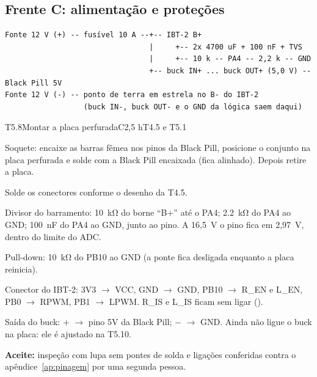 \documentclass[11pt,a4paper]{article}
\newcommand{\cmd}[1]{\texttt{\detokenize{#1}}}   %
\newcommand{\arq}[1]{\path{#1}}                    %
\newcommand{\flecha}{\ensuremath{\rightarrow}}
\begin{document}
\subsection{Frente C: alimentação e proteções}

\begin{tcolorbox}[enhanced, colback=black!3, colframe=black!40, boxrule=0.5pt, arc=1.5pt,
    title={Esquema de alimentação (de \arq{docs/ligacoes.md})},
    fonttitle=\sffamily\bfseries\small, colbacktitle=black!60, coltitle=white,
    fontupper=\footnotesize]
\begin{verbatim}
Fonte 12 V (+) -- fusível 10 A --+-- IBT-2 B+
                                 |     +-- 2x 4700 uF + 100 nF + TVS
                                 |     +-- 10 k -- PA4 -- 2,2 k -- GND
                                 +-- buck IN+ ... buck OUT+ (5,0 V) -- Black Pill 5V
Fonte 12 V (-) -- ponto de terra em estrela no B- do IBT-2
                  (buck IN-, buck OUT- e o GND da lógica saem daqui)
\end{verbatim}
\end{tcolorbox}

\begin{tarefa}{T5.8}{Montar a placa perfurada}{C}{2,5 h}{T4.5 e T5.1}
\begin{passos}
  \item Soquete: encaixe as barras fêmea nos pinos da Black Pill, posicione o conjunto na
    placa perfurada e solde com a Black Pill encaixada (fica alinhado). Depois retire a
    placa.
  \item Solde os conectores conforme o desenho da T4.5.
  \item Divisor do barramento: \qty{10}{\kilo\ohm} do borne ``B+'' até o
    PA4; \qty{2,2}{\kilo\ohm} do PA4 ao GND; \qty{100}{\nano\farad} do PA4 ao GND, junto ao
    pino. A 16,5~V o pino fica em 2,97~V, dentro do limite do ADC.
  \item Pull-down: \qty{10}{\kilo\ohm} do PB10 ao GND (a ponte fica desligada enquanto a placa
    reinicia).
  \item Conector do IBT-2: 3V3 \flecha{} VCC, GND \flecha{} GND, PB10 \flecha{} R\_EN e L\_EN,
    PB0 \flecha{} RPWM, PB1 \flecha{} LPWM. R\_IS e L\_IS ficam sem ligar
    (\cmd{USE_CURRENT_SENSE 0}).
  \item Saída do buck: + \flecha{} pino 5V da Black Pill; $-$ \flecha{} GND. Ainda não ligue o buck
    na placa: ele é ajustado na T5.10.
\end{passos}
\textbf{Aceite:} inspeção com lupa sem pontes de solda e ligações conferidas contra o
apêndice~\ref{ap:pinagem} por uma segunda pessoa.
\end{tarefa}
\end{document}
